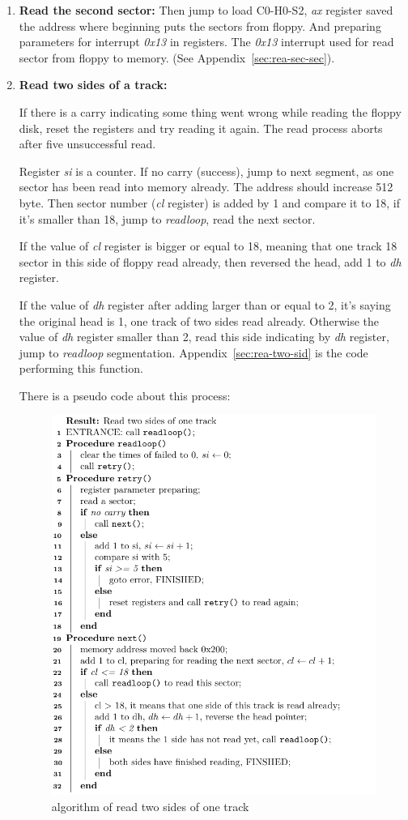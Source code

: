 \documentclass{swfcthesis}
\begin{document}
\begin{enumerate}
\item \textbf{Read the second sector:} Then jump to load C0-H0-S2, \emph{ax} register
  saved the address where beginning puts the sectors from floppy. And preparing parameters
  for interrupt \emph{0x13} in registers. The \emph{0x13} interrupt used for read
  sector from floppy to memory. (See Appendix~\ref{sec:rea-sec-sec}).
\item \textbf{Read two sides of a track:}
  
  If there is a carry indicating some thing went wrong while reading the floppy disk,
  reset the registers and try reading it again. The read process aborts after five
  unsuccessful read.

  Register \emph{si} is a counter. If no carry (success), jump to next segment, as one
  sector has been read into memory already. The address should increase 512 byte. Then
  sector number (\emph{cl} register) is added by 1 and compare it to 18, if it's smaller
  than 18, jump to \emph{readloop}, read the next sector.

  If the value of \emph{cl} register is bigger or equal to 18, meaning that one track
  18 sector in this side of floppy read already, then reversed the head, add 1 to
  \emph{dh} register.

  If the value of \emph{dh} register after adding larger than or equal to 2, it's saying
  the original head is 1, one track of two sides read already. Otherwise the value of
  \emph{dh} register smaller than 2, read this side indicating by \emph{dh} register,
  jump to \emph{readloop} segmentation. Appendix~\ref{sec:rea-two-sid} is the code 
  performing this function.

  There is a pseudo code about this process:
  \begin{figure}[!ht]
    \centering
    \includegraphics[width=.7\textwidth]{./figs/algorithm/read_two_side.pdf}
    \caption{algorithm of read two sides of one track}
    \label{fig:read_two_sides}
  \end{figure}


\end{enumerate}
\end{document}
